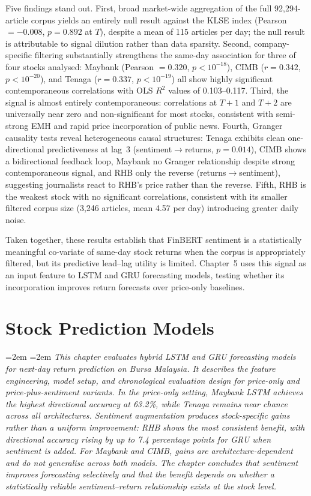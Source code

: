 \documentclass[12pt]{ucetd}
\newcommand{\chapterabstract}[1]{%
  \par\vspace{1em}
  \begingroup
  \leftskip=2em
  \rightskip=2em
  \noindent\itshape
  #1
  \par
  \endgroup
  \vspace{1.5em}
}
\begin{document}
Five findings stand out. First, broad market-wide aggregation of the full 92,294-article corpus yields an entirely null result against the KLSE index (Pearson $= -0.008$, $p = 0.892$ at $T$), despite a mean of 115 articles per day; the null result is attributable to signal dilution rather than data sparsity. Second, company-specific filtering substantially strengthens the same-day association for three of four stocks analysed: Maybank (Pearson $= 0.320$, $p < 10^{-18}$), CIMB ($r = 0.342$, $p < 10^{-20}$), and Tenaga ($r = 0.337$, $p < 10^{-19}$) all show highly significant contemporaneous correlations with OLS $R^2$ values of 0.103--0.117. Third, the signal is almost entirely contemporaneous: correlations at $T{+}1$ and $T{+}2$ are universally near zero and non-significant for most stocks, consistent with semi-strong EMH and rapid price incorporation of public news. Fourth, Granger causality tests reveal heterogeneous causal structures: Tenaga exhibits clean one-directional predictiveness at lag~3 (sentiment$\to$returns, $p = 0.014$), CIMB shows a bidirectional feedback loop, Maybank no Granger relationship despite strong contemporaneous signal, and RHB only the reverse (returns$\to$sentiment), suggesting journalists react to RHB's price rather than the reverse. Fifth, RHB is the weakest stock with no significant correlations, consistent with its smaller filtered corpus size (3,246 articles, mean 4.57 per day) introducing greater daily noise.

Taken together, these results establish that FinBERT sentiment is a statistically meaningful co-variate of same-day stock returns when the corpus is appropriately filtered, but its predictive lead--lag utility is limited. Chapter~5 uses this signal as an input feature to LSTM and GRU forecasting models, testing whether its incorporation improves return forecasts over price-only baselines.




\chapter{Stock Prediction Models}

\chapterabstract{This chapter evaluates hybrid LSTM and GRU forecasting models for next-day return prediction on Bursa Malaysia. It describes the feature engineering, model setup, and chronological evaluation design for price-only and price-plus-sentiment variants. In the price-only setting, Maybank LSTM achieves the highest directional accuracy at 63.2\%, while Tenaga remains near chance across all architectures. Sentiment augmentation produces stock-specific gains rather than a uniform improvement: RHB shows the most consistent benefit, with directional accuracy rising by up to 7.4 percentage points for GRU when sentiment is added. For Maybank and CIMB, gains are architecture-dependent and do not generalise across both models. The chapter concludes that sentiment improves forecasting selectively and that the benefit depends on whether a statistically reliable sentiment--return relationship exists at the stock level.}
\end{document}
